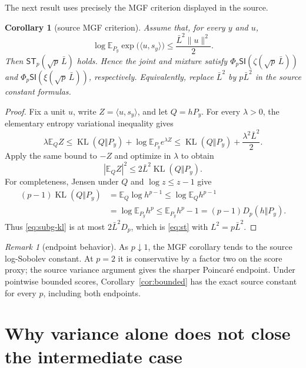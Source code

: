\documentclass[11pt]{article}
\newtheorem{corollary}[theorem]{Corollary}
\theoremstyle{remark}
\newtheorem{remark}[theorem]{Remark}
\newcommand{\E}{\mathbb E}
\newcommand{\KL}{\operatorname{KL}}
\newcommand{\norm}[1]{\lVert#1\rVert}
\newcommand{\ip}[2]{\langle#1,#2\rangle}
\newcommand{\ST}{\mathsf{ST}_p}
\begin{document}
The next result uses precisely the MGF criterion displayed in the source.

\begin{corollary}[source MGF criterion]
\label{cor:mgf}
Assume that, for every $y$ and $u$,
\begin{equation}
 \log\E_{P_y}\exp\bigl(\ip{u}{s_y}\bigr)
 \leq\frac{\bar L^2\norm u^2}{2}.
 \label{eq:mgf}
\end{equation}
Then $\ST(\sqrt p\,\bar L)$ holds.  Hence the joint and mixture satisfy
$\Phi_p\mathsf{SI}(\zeta(\sqrt p\,\bar L))$ and
$\Phi_p\mathsf{SI}(\xi(\sqrt p\,\bar L))$, respectively.
Equivalently, replace $\bar L^2$ by $p\bar L^2$ in the source constant
formulas.
\end{corollary}

\begin{proof}
Fix a unit $u$, write $Z=\ip{u}{s_y}$, and let $Q=hP_y$.  For every
$\lambda>0$, the elementary entropy variational inequality gives
\[
 \lambda\E_QZ
 \leq \KL(Q\Vert P_y)+\log\E_{P_y}e^{\lambda Z}
 \leq \KL(Q\Vert P_y)+\frac{\lambda^2\bar L^2}{2}.
\]
Apply the same bound to $-Z$ and optimize in $\lambda$ to obtain
\begin{equation}
 |\E_QZ|^2\leq2\bar L^2\KL(Q\Vert P_y).
 \label{eq:subg-kl}
\end{equation}
For completeness, Jensen under $Q$ and $\log z\leq z-1$ give
\begin{align*}
 (p-1)\KL(Q\Vert P_y)
 &=\E_Q\log h^{p-1}
 \leq\log\E_Qh^{p-1}\\
 &=\log\E_{P_y}h^p
 \leq\E_{P_y}h^p-1
 =(p-1)D_p(h\Vert P_y).
\end{align*}
Thus \eqref{eq:subg-kl} is at most $2\bar L^2D_p$, which is
\eqref{eq:st} with $L^2=p\bar L^2$.
\end{proof}

\begin{remark}[endpoint behavior]
As $p\downarrow1$, the MGF corollary tends to the source log-Sobolev
constant.  At $p=2$ it is conservative by a factor two on the score proxy;
the source variance argument gives the sharper Poincar\'e endpoint.  Under
pointwise bounded scores, Corollary~\ref{cor:bounded} has the exact source
constant for every $p$, including both endpoints.
\end{remark}

\section{Why variance alone does not close the intermediate case}
\end{document}

